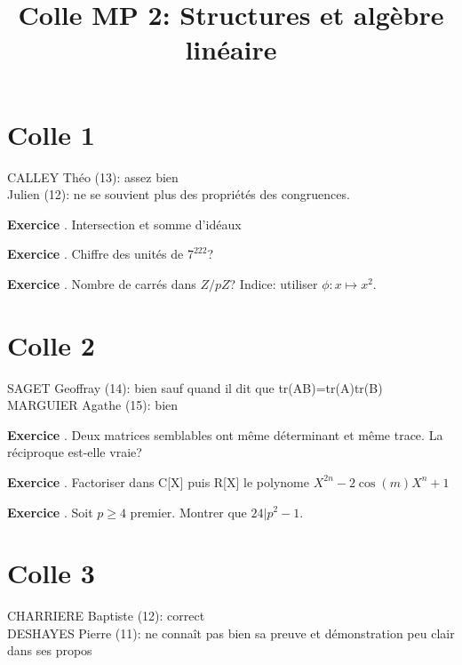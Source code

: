 \documentclass[10pt,a4paper]{article}
\title{Colle MP 2: Structures et algèbre linéaire}
\newcounter{question}
\newcounter{exo}
\newenvironment{exo}{\vspace{0.5cm}\setcounter{question}{0}\addtocounter{exo}{1} \noindent \textbf{Exercice \theexo}. \normalsize }{\par}
\begin{document}
	\maketitle
	
	\section*{Colle 1}
	CALLEY Théo (13): assez bien\\
	Julien (12): ne se souvient plus des propriétés des congruences. \\
	
	\begin{exo}
		Intersection et somme d’idéaux
	\end{exo}

	\begin{exo}
		Chiffre des unités de $7^{222}$?
	\end{exo}

	\begin{exo}
		Nombre de carrés dans $Z/pZ$? Indice: utiliser $\phi : x \longmapsto x^2$.
	\end{exo}
		
	\section*{Colle 2}
	\setcounter{exo}{0}
	SAGET Geoffray (14): bien sauf quand il dit que tr(AB)=tr(A)tr(B)\\
	MARGUIER Agathe (15): bien\\
	
	\begin{exo}
		Deux matrices semblables ont même déterminant et même trace. La réciproque est-elle vraie?
	\end{exo}
	
	\begin{exo}
		Factoriser dans C[X] puis R[X] le polynome $X^{2n} - 2\cos(m)X^n + 1$
	\end{exo}

	\begin{exo}
		Soit $p \geq 4$ premier. Montrer que $24 \vert p^2 - 1$.
	\end{exo}

	\section*{Colle 3}
	\setcounter{exo}{0}
	CHARRIERE Baptiste (12): correct\\
	DESHAYES Pierre (11): ne connaît pas bien sa preuve et démonstration peu clair dans ses propos\\
	
\end{document}

